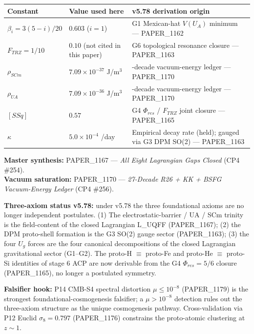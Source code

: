 \documentclass[12pt,a4paper]{article}
\begin{document}
\begin{table}[H]
\centering
\small
\begin{tabularx}{\linewidth}{@{}>{\raggedright\arraybackslash}X>{\raggedright\arraybackslash}X>{\raggedright\arraybackslash}X@{}}
\toprule
Constant & Value used here & v5.78 derivation origin \tabularnewline
\midrule
$\beta_i = 3(5-i)/20$ & $0.603$ ($i=1$) & G1 Mexican-hat $V(U_A)$ minimum --- PAPER\_1162 \tabularnewline
$F_{TRZ} = 1/10$ & $0.10$ (not cited in this paper) & G6 topological resonance closure --- PAPER\_1163 \tabularnewline
$\rho_{SCm}$ & $7.09\times10^{-37}$ J/m$^{3}$ & 27-decade vacuum-energy ledger --- PAPER\_1170 \tabularnewline
$\rho_{UA}$ & $7.09\times10^{-36}$ J/m$^{3}$ & 27-decade vacuum-energy ledger --- PAPER\_1170 \tabularnewline
$[SSq]$ & $0.57$ & G4 $\Phi_{res}$ / $F_{TRZ}$ joint closure --- PAPER\_1165 \tabularnewline
$\kappa$ & $5.0\times10^{-4}$ /day & Empirical decay rate (held); gauged via G3 DPM SO(2) --- PAPER\_1163 \tabularnewline
\bottomrule
\end{tabularx}
\end{table}

\begin{flushleft}
\textbf{Master synthesis:} PAPER\_1167 --- \emph{All Eight Lagrangian Gaps Closed} (CP4 \#254). \\
\textbf{Vacuum saturation:} PAPER\_1170 --- \emph{27-Decade R26 + KK + BSFG Vacuum-Energy Ledger} (CP4 \#256). \\
\end{flushleft}

\textbf{Three-axiom status v5.78:} under v5.78 the three foundational axioms are no longer independent postulates. (1) The electrostatic-barrier / UA / SCm trinity is the field-content of the closed Lagrangian L\_UQFF (PAPER\_1167); (2) the DPM proto-shell formation is the G3 SO(2) gauge sector (PAPER\_1163); (3) the four $U_g$ forces are the four canonical decompositions of the closed Lagrangian gravitational sector (G1--G2). The proto-H $\equiv$ proto-Fe and proto-He $\equiv$ proto-Si identities of stage 6 ACP are now derivable from the G4 $\Phi_{res}=5/6$ closure (PAPER\_1165), no longer a postulated symmetry.

\textbf{Falsifier hook:} P14 CMB-S4 spectral distortion $\mu \le 10^{-8}$ (PAPER\_1179) is the strongest foundational-cosmogenesis falsifier; a $\mu > 10^{-8}$ detection rules out the three-axiom structure as the unique cosmogenesis pathway. Cross-validation via P12 Euclid $\sigma_8 = 0.797$ (PAPER\_1176) constrains the proto-atomic clustering at $z\sim 1$.
\end{document}
